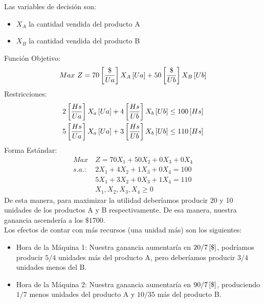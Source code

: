 \documentclass{tarea}
\begin{document}
\begin{homeworkProblem}[-1][Compañía]
Las variables de decisión son:
\begin{itemize}
	\item $X_A$ la cantidad vendida del producto A
	\item $X_B$ la cantidad vendida del producto B
\end{itemize}
Función Objetivo:
\begin{equation}
	Max\ Z = 70\left[ \frac{\$}{Ua} \right]X_A\left[ Ua \right] + 50\left[ \frac{\$}{Ub} \right]X_B\left[ Ub \right]
\end{equation}
Restricciones:
\begin{align*}
  2\left[ \frac{Hs}{Ua} \right]X_a\left[ Ua \right] + 4\left[ \frac{Hs}{Ub} \right]X_b\left[ Ub \right] \le 100 \left[ Hs \right] \\
  5\left[ \frac{Hs}{Ua} \right]X_a\left[ Ua \right] + 3\left[ \frac{Hs}{Ub} \right]X_b\left[ Ub \right] \le 110 \left[ Hs \right] \\  
\end{align*}
Forma Estándar:
\begin{align*}
	Max\ &Z = 70X_1 + 50X_2 + 0X_3 + 0X_4 \\
	s.a.: &2X_1 + 4X_2 + 1X_3 + 0X_4 = 100 \\
	&5X_1 + 3X_2 + 0X_3 + 1X_4 = 110 \\
	&X_1,X_2,X_3,X_4 \ge 0
\end{align*}
De esta manera, para maximizar la utilidad deberíamos producir 20 y 10 unidades de los productos A y B respectivamente.
De esa manera, nuestra ganancia ascendería a los $\$1700$.\\
Los efectos de contar con más recursos (una unidad más) son los siguientes:
\begin{itemize}
	\item Hora de la Máquina 1: Nuestra ganancia aumentaría en $20/7\left[ \$ \right]$, 
	podríamos producir $5/4$ unidades más del producto A, pero deberíamos producir $3/4$ unidades menos del B.
	\item Hora de la Máquina 2: Nuestra ganancia aumentaría en $90/7\left[ \$ \right]$, produciendo $1/7$ menos unidades del producto A y $10/35$ más del producto B. 
\end{itemize}

\end{homeworkProblem}
\end{document}
